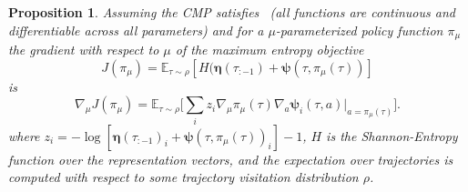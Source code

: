 \documentclass{article}
\theoremstyle{plain}
\newtheorem{proposition}[theorem]{Proposition}
\theoremstyle{definition}
\theoremstyle{remark}
\begin{document}
\begin{proposition}\label{prop:pg}
    Assuming the CMP satisfies~\citep[conditions A.1]{silver2014deterministic} (all functions are continuous and differentiable across all parameters) and for a $\mu$-parameterized policy function $\pi_{\mu}$ the gradient with respect to $\mu$ of the maximum entropy objective
    \begin{equation*}
        J(\pi_{\mu}) = \mathbb{E}_{\tau\sim\rho} [H(\pmb{\eta}(\tau_{:-1}) + \pmb{\psi} (\tau, \pi_{\mu}(\tau))]
    \end{equation*}
    is
    \begin{equation*}
        \nabla_{\mu} J(\pi_{\mu}) = \mathbb{E}_{\tau\sim\rho} \Big[ \sum_i z_i \nabla_{\mu} \pi_{\mu} (\tau) \nabla_a \pmb{\psi}_i(\tau,a) \big|_{a=\pi_{\mu}(\tau)}\Big] .
    \end{equation*}
    where $z_i=-\log[\pmb{\eta}(\tau_{:-1})_i + \pmb{\psi}(\tau, \pi_{\mu}(\tau))_i] - 1$, $H$ is the Shannon-Entropy function over the representation vectors, and the expectation over trajectories is computed with respect to some trajectory visitation distribution $\rho$. 
\end{proposition}
\end{document}
